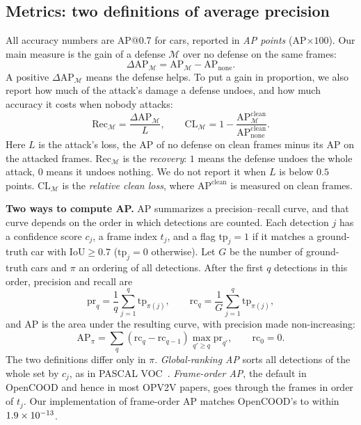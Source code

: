 \documentclass[conference]{IEEEtran}
\begin{document}
\subsection{Metrics: two definitions of average precision}
\label{sec:metrics}
All accuracy numbers are AP@0.7 for cars, reported in \emph{AP points} (AP$\times 100$). Our main measure is
the gain of a defense $\mathcal{M}$ over no defense on the same frames:
\begin{equation}
\Delta\mathrm{AP}_{\mathcal{M}}=\mathrm{AP}_{\mathcal{M}}-\mathrm{AP}_{\mathrm{none}}.
\label{eq:dap}
\end{equation}
A positive $\Delta\mathrm{AP}_{\mathcal{M}}$ means the defense helps. To put a gain in proportion, we also report
how much of the attack's damage a defense undoes, and how much accuracy it costs when nobody attacks:
\begin{equation}
\mathrm{Rec}_{\mathcal{M}}=\frac{\Delta\mathrm{AP}_{\mathcal{M}}}{L},\qquad
\mathrm{CL}_{\mathcal{M}}=1-\frac{\mathrm{AP}^{\mathrm{clean}}_{\mathcal{M}}}{\mathrm{AP}^{\mathrm{clean}}_{\mathrm{none}}}.
\label{eq:rec}
\end{equation}
Here $L$ is the attack's loss, the AP of no defense on clean frames minus its AP on the attacked frames.
$\mathrm{Rec}_{\mathcal{M}}$ is the \emph{recovery}: $1$ means the defense undoes the whole attack, $0$ means it
undoes nothing. We do not report it when $L$ is below $0.5$ points. $\mathrm{CL}_{\mathcal{M}}$ is the
\emph{relative clean loss}, where $\mathrm{AP}^{\mathrm{clean}}$ is measured on clean frames.

\textbf{Two ways to compute AP.} AP summarizes a precision--recall curve, and that curve depends on the order in
which detections are counted. Each detection $j$ has a confidence score $c_j$, a frame index $t_j$, and a flag
$\mathrm{tp}_j=1$ if it matches a ground-truth car with IoU${}\ge 0.7$ ($\mathrm{tp}_j=0$ otherwise). Let $G$ be
the number of ground-truth cars and $\pi$ an ordering of all detections. After the first $q$ detections in this
order, precision and recall are
\begin{equation}
\mathrm{pr}_q=\frac{1}{q}\sum_{j=1}^{q}\mathrm{tp}_{\pi(j)},\qquad
\mathrm{rc}_q=\frac{1}{G}\sum_{j=1}^{q}\mathrm{tp}_{\pi(j)},
\label{eq:prrc}
\end{equation}
and AP is the area under the resulting curve, with precision made non-increasing:
\begin{equation}
\mathrm{AP}_\pi=\sum_{q}(\mathrm{rc}_q-\mathrm{rc}_{q-1})\max_{q'\ge q}\mathrm{pr}_{q'},\qquad \mathrm{rc}_0=0.
\label{eq:ap}
\end{equation}
The two definitions differ only in $\pi$. \emph{Global-ranking AP} sorts all detections of the whole set by
$c_j$, as in PASCAL VOC~\cite{everingham2010voc}. \emph{Frame-order AP}, the default in OpenCOOD and hence in most
OPV2V papers, goes through the frames in order of $t_j$. Our implementation of frame-order AP matches OpenCOOD's
to within $1.9\times 10^{-13}$.
\end{document}
